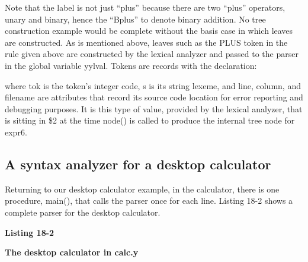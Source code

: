 
Note that the label is not just
{\textquotedblleft}plus{\textquotedblright} because there are two
{\textquotedblleft}plus{\textquotedblright} operators, unary and
binary, hence the {\textquotedblleft}Bplus{\textquotedblright} to
denote binary addition. No tree construction example would be complete
without the basis case in which leaves are constructed. As is mentioned
above, leaves such as the \textsf{PLUS} token in the rule given above
are constructed by the lexical analyzer and passed to the parser in the
global variable \textsf{yylval}. Tokens are records with the
declaration:


\noindent
where \textsf{tok} is the token's integer code,
\textsf{s} is its string lexeme, and \textsf{line}, \textsf{column},
and \textsf{filename} are attributes that record its source code
location for error reporting and debugging purposes. It is this type of
value, provided by the lexical analyzer, that is sitting in
\textsf{\$2} at the time \textsf{node()} is called to produce the
internal tree node for \textsf{expr6}.

\subsection{A syntax analyzer for a desktop calculator}

Returning to our desktop calculator example, in the calculator, there is
one procedure, \textsf{main()}, that calls the parser once for each
line. Listing 18-2 shows a complete parser for the desktop calculator.

\bigskip

{\sffamily\bfseries
Listing 18-2}

{\sffamily\bfseries
The desktop calculator in calc.y}


